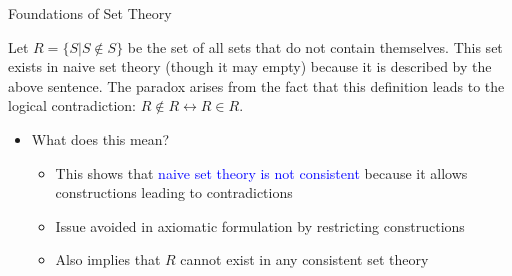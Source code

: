 \documentclass[10pt,english]{beamer}
\begin{document}
\begin{frame}{Foundations of Set Theory}

\begin{example}
Let $R = \{S|S\notin S\}$ be the set of all sets that do not contain themselves.
This set exists in naive set theory (though it may empty) because it is described by the above sentence.
The paradox arises from the fact that this definition leads to the logical contradiction: $R\notin R \leftrightarrow R\in R$.
\end{example}

\vspace{5mm}

\begin{itemize}
\setlength\itemsep{3mm}
\item<1-> What does this mean? \vspace{1mm}
\begin{itemize} 
  \setlength\itemsep{1.5mm}
  \item This shows that \textcolor{blue}{naive set theory is not consistent} because it allows constructions leading to contradictions
  \item Issue avoided in axiomatic formulation by restricting constructions
  \item Also implies that $R$ cannot exist in any consistent set theory
\end{itemize}

\end{itemize}
\end{frame}
\end{document}
